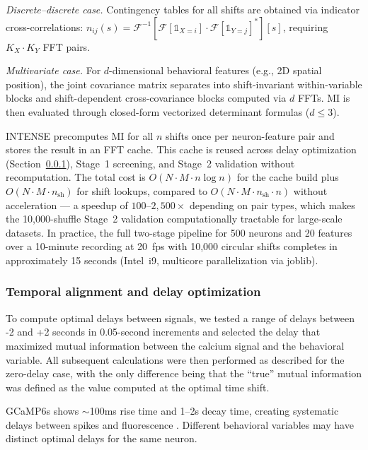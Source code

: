 \textit{Discrete--discrete case.}
Contingency tables for all shifts are obtained via indicator cross-correlations:
$n_{ij}(s) = \mathcal{F}^{-1}[\mathcal{F}[\mathbb{1}_{X=i}] \cdot
\mathcal{F}[\mathbb{1}_{Y=j}]^{*}][s]$, requiring $K_X \cdot K_Y$ FFT pairs.

\textit{Multivariate case.}
For $d$-dimensional behavioral features (e.g., 2D spatial position), the joint
covariance matrix separates into shift-invariant within-variable blocks and
shift-dependent cross-covariance blocks computed via $d$ FFTs. MI is then
evaluated through closed-form vectorized determinant formulas ($d \leq 3$).

INTENSE precomputes MI for all $n$ shifts once per neuron-feature pair and stores
the result in an FFT cache. This cache is reused across delay optimization
(Section~\ref{sec:temporal_alignment}), Stage~1 screening, and Stage~2
validation without recomputation. The total cost is $O(N \cdot M \cdot n \log n)$
for the cache build plus $O(N \cdot M \cdot n_{\text{sh}})$ for shift lookups,
compared to $O(N \cdot M \cdot n_{\text{sh}} \cdot n)$ without acceleration ---
a speedup of $100$--$2{,}500\times$ depending on pair types, which makes the
10,000-shuffle Stage~2 validation computationally tractable for large-scale
datasets. In practice, the full two-stage pipeline for 500 neurons and 20 features
over a 10-minute recording at 20~fps with 10{,}000 circular shifts completes in
approximately 15 seconds (Intel~i9, multicore parallelization via joblib).

\subsubsection{Temporal alignment and delay optimization}
\label{sec:temporal_alignment}

To compute optimal delays between signals, we tested a range of delays between -2
and +2 seconds in 0.05-second increments and selected the delay that maximized
mutual information between the calcium signal and the behavioral variable. All
subsequent calculations were then performed as described for the zero-delay case,
with the only difference being that the ``true'' mutual information was defined as the
value computed at the optimal time shift.

GCaMP6s shows $\sim$100ms rise time and 1--2s decay time, creating systematic delays
between spikes and fluorescence \citep{Zhang2023}. Different behavioral variables
may have distinct optimal delays for the same neuron.

